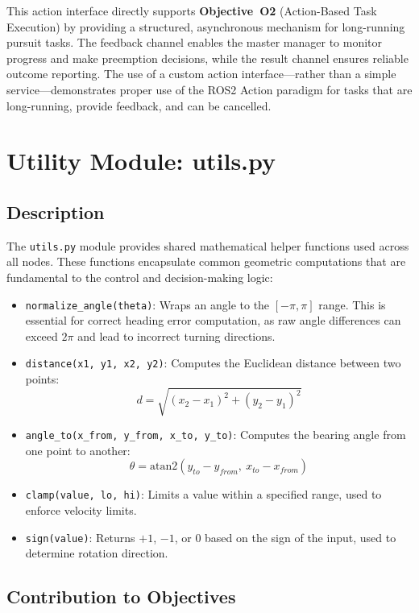 This action interface directly supports \textbf{Objective~O2} (Action-Based Task Execution) by providing a structured, asynchronous mechanism for long-running pursuit tasks. The feedback channel enables the master manager to monitor progress and make preemption decisions, while the result channel ensures reliable outcome reporting. The use of a custom action interface---rather than a simple service---demonstrates proper use of the ROS2 Action paradigm for tasks that are long-running, provide feedback, and can be cancelled.

\section{Utility Module: utils.py}

\subsection{Description}

The \texttt{utils.py} module provides shared mathematical helper functions used across all nodes. These functions encapsulate common geometric computations that are fundamental to the control and decision-making logic:

\begin{itemize}
  \item \texttt{normalize\_angle(theta)}: Wraps an angle to the $[-\pi, \pi]$ range. This is essential for correct heading error computation, as raw angle differences can exceed $2\pi$ and lead to incorrect turning directions.
  \item \texttt{distance(x1, y1, x2, y2)}: Computes the Euclidean distance between two points:
  \[
    d = \sqrt{(x_2 - x_1)^2 + (y_2 - y_1)^2}
  \]
  \item \texttt{angle\_to(x\_from, y\_from, x\_to, y\_to)}: Computes the bearing angle from one point to another:
  \[
    \theta = \text{atan2}(y_{to} - y_{from},\ x_{to} - x_{from})
  \]
  \item \texttt{clamp(value, lo, hi)}: Limits a value within a specified range, used to enforce velocity limits.
  \item \texttt{sign(value)}: Returns $+1$, $-1$, or $0$ based on the sign of the input, used to determine rotation direction.
\end{itemize}

\subsection{Contribution to Objectives}

